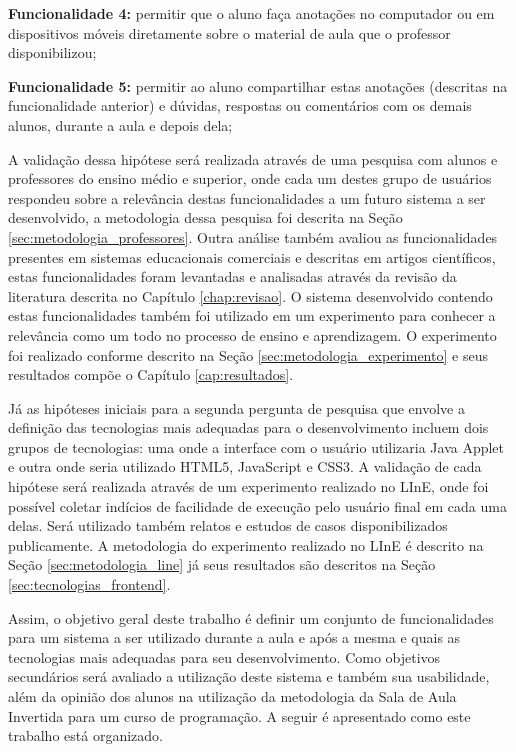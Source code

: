 \textbf{Funcionalidade 4:} permitir que o aluno faça anotações no computador ou em dispositivos móveis diretamente sobre o material de aula que o professor disponibilizou;

\textbf{Funcionalidade 5:} permitir ao aluno compartilhar estas anotações (descritas na funcionalidade anterior) e dúvidas, respostas ou comentários com os demais alunos, durante a aula e depois dela;

A validação dessa hipótese será realizada através de uma pesquisa com alunos e professores do ensino médio e superior, onde cada um destes grupo de usuários respondeu sobre a relevância destas funcionalidades a um futuro sistema a ser desenvolvido, a metodologia dessa pesquisa foi descrita na Seção \ref{sec:metodologia_professores}. Outra análise também avaliou as funcionalidades presentes em sistemas educacionais comerciais e descritas em artigos científicos, estas funcionalidades foram levantadas e analisadas através da revisão da literatura descrita no Capítulo \ref{chap:revisao}. O sistema desenvolvido contendo estas funcionalidades também foi utilizado em um experimento para conhecer a relevância como um todo no processo de ensino e aprendizagem. O experimento foi realizado conforme descrito na Seção \ref{sec:metodologia_experimento} e seus resultados compõe o Capítulo \ref{cap:resultados}.

Já as hipóteses iniciais para a segunda pergunta de pesquisa que envolve a definição das tecnologias mais adequadas para o desenvolvimento incluem dois grupos de tecnologias: uma onde a interface com o usuário utilizaria Java Applet e outra onde seria utilizado HTML5, JavaScript e CSS3. A validação de cada hipótese será realizada através de um experimento realizado no LInE, onde foi possível coletar indícios de facilidade de execução pelo usuário final em cada uma delas. Será utilizado também relatos e estudos de casos disponibilizados publicamente. A metodologia do experimento realizado no LInE é descrito na Seção \ref{sec:metodologia_line} já seus resultados são descritos na Seção \ref{sec:tecnologias_frontend}.

Assim, o objetivo geral deste trabalho é definir um conjunto de funcionalidades para um sistema a ser utilizado durante a aula e após a mesma e quais as tecnologias mais adequadas para seu desenvolvimento. Como objetivos secundários será avaliado a utilização deste sistema e também sua usabilidade, além da opinião dos alunos na utilização da metodologia da Sala de Aula Invertida para um curso de programação. A seguir é apresentado como este trabalho está organizado.

